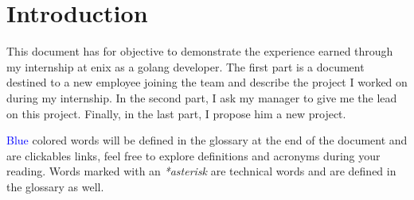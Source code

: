 \chapter{Introduction}





This document has for objective to demonstrate the experience earned through my internship at \gls{enix} as a golang developer. The first part is a document destined to a new employee joining the team and describe the project I worked on during my internship. In the second part, I ask my manager to give me the lead on this project. Finally, in the last part, I propose him a new project.

\textcolor{blue}{Blue} colored words will be defined in the glossary at the end of the document and are clickables links, feel free to explore definitions and acronyms during your reading. Words marked with an \emph{*asterisk} are technical words and are defined in the glossary as well.

\clearpage
